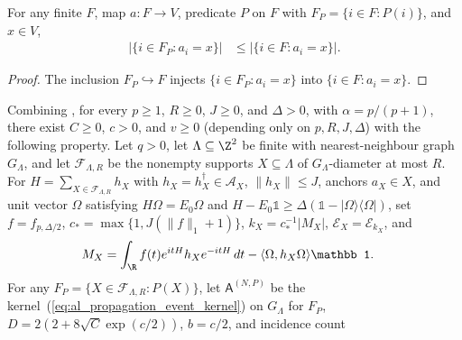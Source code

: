 \begin{lemma}
    \label{thm:al_retained_anchor_fibers}
    \leanok
    For any finite $F$, map $a:F\to V$, predicate $P$ on $F$ with
    $F_P=\{i\in F:P(i)\}$, and $x\in V$,
    \begin{align}
        \label{eq:al_propagation_retained_fiber}
        |\{i\in F_P:a_i=x\}| & \le|\{i\in F:a_i=x\}|.
    \end{align}
\end{lemma}
\begin{proof}
    \leanok
    The inclusion $F_P\hookrightarrow F$ injects $\{i\in F_P:a_i=x\}$ into
    $\{i\in F:a_i=x\}$.
\end{proof}

\begin{lemma}
    \label{thm:al_lattice_channel_uniform_bounds}
    \leanok
    Combining \cite[Proposition~4.3 and Section~10]{OpenAI2026AreaLaw}, for
    every $p\ge1$, $R\ge0$, $J\ge0$, and $\Delta>0$, with $\alpha=p/(p+1)$,
    there exist $C\ge0$, $c>0$, and $v\ge0$ (depending only on
    $p,R,J,\Delta$) with the following property. Let $q>0$, let
    $\Lambda\subseteq\Z^2$ be finite with nearest-neighbour graph $G_\Lambda$,
    and let $\mathcal F_{\Lambda,R}$ be the nonempty supports
    $X\subseteq\Lambda$ of $G_\Lambda$-diameter at most $R$. For
    $H=\sum_{X\in\mathcal F_{\Lambda,R}}h_X$ with $h_X=h_X^\dagger\in\mathcal A_X$,
    $\|h_X\|\le J$, anchors $a_X\in X$, and unit vector $\Omega$ satisfying
    $H\Omega=E_0\Omega$ and
    $H-E_0\mathbb 1\ge\Delta(\mathbb 1-|\Omega\rangle\langle\Omega|)$, set
    $f=f_{p,\Delta/2}$, $c_*=\max\{1,J(\|f\|_1+1)\}$, $k_X=c_*^{-1}|M_X|$,
    $\mathcal E_X=\mathcal E_{k_X}$, and
    \begin{align}
        \label{eq:al_propagation_lattice_filter}
        M_X & =\int_{\R}f(t)e^{itH}h_Xe^{-itH}\,dt
        -\langle\Omega,h_X\Omega\rangle\mathbb 1.
    \end{align}
    For any $F_P=\{X\in\mathcal F_{\Lambda,R}:P(X)\}$, let $\mathsf A^{(N,P)}$
    be the kernel~(\ref{eq:al_propagation_event_kernel}) on $G_\Lambda$ for
    $F_P$, $D=2(2+8\sqrt C\exp(c/2))$, $b=c/2$, and incidence count
    \begin{align}
        \label{eq:al_propagation_retained_count}

\end{align}
\end{lemma}
